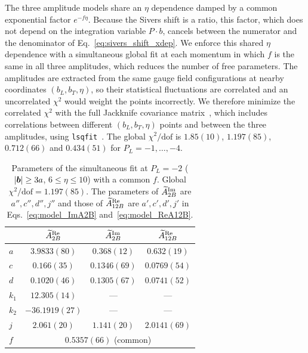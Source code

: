 The three amplitude models share an $\eta$ dependence damped by a common exponential factor $e^{-f\eta}$. Because the Sivers shift is a ratio, this factor, which does not depend on the integration variable $P\cdot b$, cancels between the numerator and the denominator of Eq.~\eqref{eq:sivers_shift_xdep}. We enforce this shared $\eta$ dependence with a simultaneous global fit at each momentum in which $f$ is the same in all three amplitudes, which reduces the number of free parameters. The amplitudes are extracted from the same gauge field configurations at nearby coordinates $(b_L,b_T,\eta)$, so their statistical fluctuations are correlated and an uncorrelated $\chi^2$ would weight the points incorrectly. We therefore minimize the correlated $\chi^2$ with the full Jackknife covariance matrix~\cite{Boram2011Covariance}, which includes correlations between different $(b_L,b_T,\eta)$ points and between the three amplitudes, using \texttt{lsqfit}~\cite{Lepage:2001ym}. The global $\chi^2/\text{dof}$ is $1.85(10)$, $1.197(85)$, $0.712(66)$ and $0.434(51)$ for $P_L=-1,\ldots,-4$.

\begin{table}
\caption{Parameters of the simultaneous fit at $P_L=-2$ ($|\boldsymbol{b}|\ge3a$, $6\le\eta\le10$) with a common $f$. Global $\chi^2/\text{dof}=1.197(85)$. The parameters of $\widetilde{A}_{2B}^{\text{Im}}$ are $a'',c'',d'',j''$ and those of $\widetilde{A}_{12B}^{\text{Re}}$ are $a',c',d',j'$ in Eqs.~\eqref{eq:model_ImA2B} and~\eqref{eq:model_ReA12B}.}
\label{tab:fit_params_P2}
\small
\begin{ruledtabular}
\begin{tabular}{lccc}
 & $\widetilde{A}_{2B}^{\text{Re}}$ & $\widetilde{A}_{2B}^{\text{Im}}$ & $\widetilde{A}_{12B}^{\text{Re}}$ \\
\hline
$a$ & $3.9833(80)$ & $0.368(12)$ & $0.632(19)$ \\
$c$ & $0.166(35)$ & $0.1346(69)$ & $0.0769(54)$ \\
$d$ & $0.1020(46)$ & $0.1305(67)$ & $0.0741(52)$ \\
$k_1$ & $12.305(14)$ & --- & --- \\
$k_2$ & $-36.1919(27)$ & --- & --- \\
$j$ & $2.061(20)$ & $1.141(20)$ & $2.0141(69)$ \\
$f$ & \multicolumn{3}{c}{$0.5357(66)$ (common)} \\
\end{tabular}
\end{ruledtabular}
\end{table}

